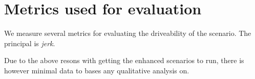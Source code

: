\section{Metrics used for evaluation}

We measure several metrics for evaluating the driveability of the scenario. The
principal is \emph{jerk}.

Due to the above resons with getting the enhanced scenarios to run, there is
however minimal data to bases any qualitative analysis on.